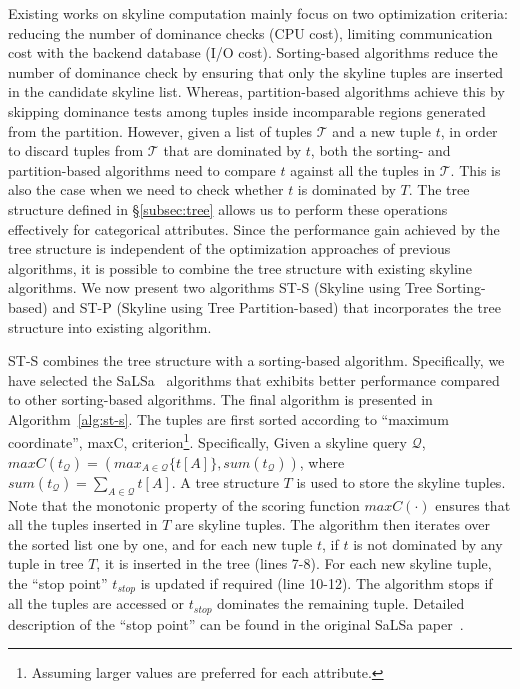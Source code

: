 Existing works on skyline computation mainly focus on two optimization criteria: reducing the number of dominance checks (CPU cost), limiting communication cost with the backend database (I/O cost). Sorting-based algorithms reduce the number of dominance check by ensuring that only the skyline tuples are inserted in the candidate skyline list. Whereas, partition-based algorithms achieve this by skipping dominance tests among tuples inside incomparable regions generated from the partition. However, given a list of tuples $\mathcal{T}$ and a new tuple $t$, in order to discard tuples from $\mathcal{T}$ that are dominated by $t$, both the sorting- and partition-based algorithms need to compare $t$ against all the tuples in $\mathcal{T}$. This is also the case when we need to check whether $t$ is dominated by $T$. The tree structure defined in \S\ref{subsec:tree} allows us to perform these operations effectively for categorical attributes. Since the performance gain achieved by the tree structure is independent of the optimization approaches of previous algorithms, it is possible to combine the tree structure with existing skyline algorithms. We now present two algorithms ST-S (Skyline using Tree Sorting-based) and ST-P (Skyline using Tree Partition-based) that incorporates the tree structure into existing algorithm.

\vspace{1mm}
 ST-S combines the tree structure with a sorting-based algorithm. Specifically, we have selected the SaLSa~\cite{bartolini2008efficient} algorithms that exhibits better performance compared to other sorting-based algorithms. The final algorithm is presented in Algorithm~\ref{alg:st-s}. The tuples are first sorted according to ``maximum coordinate'', maxC, criterion\footnote{Assuming larger values are preferred for each attribute.}. Specifically, Given a skyline query $\mathcal{Q}$, $maxC(t_{\mathcal{Q}}) = (max_{A\in \mathcal{Q}}\{t[A]\}, sum(t_{\mathcal{Q}}))$, where $sum(t_{\mathcal{Q}}) = \sum_{A\in \mathcal{Q}} t[A]$. A tree structure $T$ is used to store the skyline tuples. Note that the monotonic property of the scoring function $maxC(\cdot)$ ensures that all the tuples inserted in $T$ are skyline tuples. The algorithm then iterates over the sorted list one by one, and for each new tuple $t$, if $t$ is not dominated by any tuple in tree $T$, it is inserted in the tree (lines 7-8). For each new skyline tuple, the ``stop point'' $t_{stop}$ is updated if required (line 10-12). The algorithm stops if all the tuples are accessed or $t_{stop}$ dominates the remaining tuple. Detailed description of the ``stop point'' can be found in the original SaLSa paper~\cite{bartolini2008efficient}.


